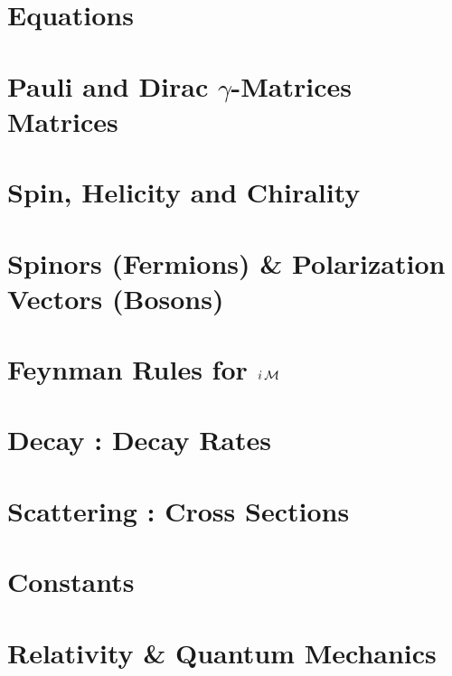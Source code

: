 \documentclass[landscape,8pt,a4paper,english]{extarticle}
\begin{document}
\begin{multicols*}{3}\centering
        \section*{Equations}
        \section*{Pauli and Dirac $\gamma$-Matrices Matrices}
        \section*{Spin, Helicity and Chirality}
        \section*{Spinors (Fermions) \& Polarization Vectors (Bosons)}
        \section*{Feynman Rules for $i\operatorname{\mathcal{M}}$}
        \section*{Decay : Decay Rates}
        \section*{Scattering : Cross Sections}
        \section*{Constants}
        \section*{Relativity \& Quantum Mechanics}
\end{multicols*}
\end{document}

